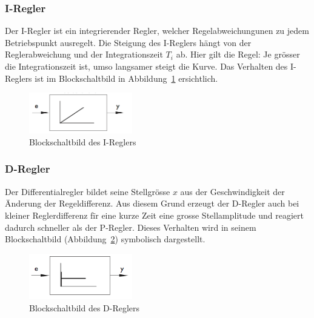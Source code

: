\subsubsection*{I-Regler}
Der  I-Regler ist  ein integrierender  Regler, welcher  Regelabweichungunen zu
jedem  Betriebspunkt ausregelt. Die  Steigung  des I-Reglers  h\"angt von  der
Reglerabweichung und  der Integrationszeit  $T_i$ ab. Hier gilt  die Regel: Je
gr\"osser  die  Integrationszeit ist,  umso  langsamer  steigt die  Kurve. Das
Verhalten des I-Reglers ist  im Blockschaltbild in Abbildung~\ref{fig:IRegler}
ersichtlich.

\begin{figure}[h!, width=\pagewidth]
    \centering
    \includegraphics[width=0.4\textwidth]{images/IRegler}
    \caption{Blockschaltbild des I-Reglers}
    \label{fig:IRegler}
\end{figure}

\subsubsection*{D-Regler}
Der Differentialregler bildet seine  Stellgr\"osse $x$ aus der Geschwindigkeit
der \"Anderung der Regeldifferenz. Aus diesem  Grund erzeugt der D-Regler auch
bei kleiner Reglerdifferenz  f\"ir eine kurze Zeit  eine grosse Stellamplitude
und  reagiert dadurch  schneller als  der P-Regler. Dieses  Verhalten wird  in
seinem Blockschaltbild (Abbildung~\ref{fig:DRegler}) symbolisch dargestellt.

\begin{figure}[h!, width=\pagewidth]
    \centering
    \includegraphics[width=0.4\textwidth]{images/DRegler}
    \caption{Blockschaltbild des D-Reglers}
    \label{fig:DRegler}
\end{figure}

